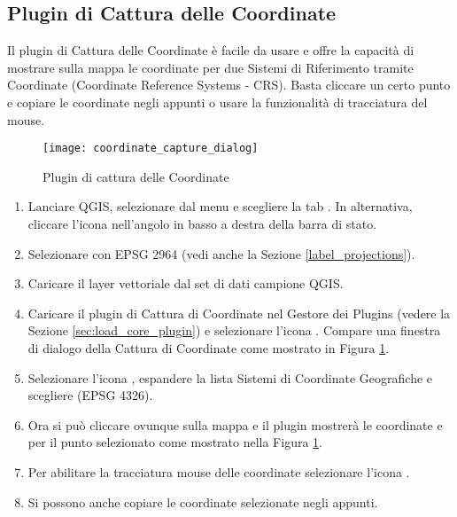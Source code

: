 
\subsection{Plugin di Cattura delle Coordinate}


Il plugin di Cattura delle Coordinate è facile da usare e offre la capacità di mostrare sulla mappa le coordinate per due Sistemi di Riferimento tramite Coordinate (Coordinate Reference Systems - CRS). Basta cliccare un certo punto e copiare le coordinate negli appunti o usare la funzionalità di tracciatura del mouse.

\begin{figure}[ht]
   \begin{center}
   \caption{Plugin di cattura delle Coordinate\nixcaption}\label{fig:coordinate_capture_dialog}\smallskip
   \texttt{[image: coordinate\_capture\_dialog]}
\end{center}  
\end{figure}

\begin{enumerate}
  \item Lanciare QGIS, selezionare  dal menu
   e scegliere la tab . In alternativa, cliccare l'icona  nell'angolo in basso a destra della barra di stato.
  \item Selezionare  
   con EPSG 2964 (vedi anche la Sezione \ref{label_projections}).
  \item Caricare il layer vettoriale  dal set di dati campione QGIS.
  \item Caricare il plugin di Cattura di Coordinate nel Gestore dei Plugins (vedere la Sezione 
  \ref{sec:load_core_plugin}) e selezionare l'icona . Compare una finestra di dialogo della Cattura di Coordinate come mostrato in Figura \ref{fig:coordinate_capture_dialog}.
  \item Selezionare l'icona , espandere la lista Sistemi di Coordinate Geografiche e scegliere  (EPSG 4326).
  \item Ora si può cliccare ovunque sulla mappa e il plugin mostrerà le coordinate 
   e  per il punto selezionato come mostrato nella Figura \ref{fig:coordinate_capture_dialog}.
  \item Per abilitare la tracciatura mouse delle coordinate selezionare l'icona .
  \item Si possono anche copiare le coordinate selezionate negli appunti.
\end{enumerate}

\newpage



